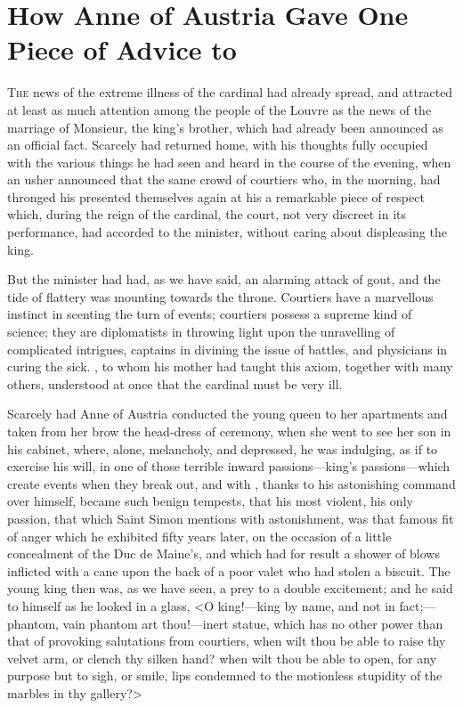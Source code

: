 \chapter{How Anne of Austria Gave One Piece of Advice to }

\lettrine{T}{he} news of the extreme illness of the cardinal had already spread, and attracted at least as much attention among the people of the Louvre as the news of the marriage of Monsieur, the king's brother, which had already been announced as an official fact. Scarcely had  returned home, with his thoughts fully occupied with the various things he had seen and heard in the course of the evening, when an usher announced that the same crowd of courtiers who, in the morning, had thronged his  presented themselves again at his  a remarkable piece of respect which, during the reign of the cardinal, the court, not very discreet in its performance, had accorded to the minister, without caring about displeasing the king.

But the minister had had, as we have said, an alarming attack of gout, and the tide of flattery was mounting towards the throne. Courtiers have a marvellous instinct in scenting the turn of events; courtiers possess a supreme kind of science; they are diplomatists in throwing light upon the unravelling of complicated intrigues, captains in divining the issue of battles, and physicians in curing the sick. , to whom his mother had taught this axiom, together with many others, understood at once that the cardinal must be very ill.

Scarcely had Anne of Austria conducted the young queen to her apartments and taken from her brow the head-dress of ceremony, when she went to see her son in his cabinet, where, alone, melancholy, and depressed, he was indulging, as if to exercise his will, in one of those terrible inward passions—king's passions—which create events when they break out, and with , thanks to his astonishing command over himself, became such benign tempests, that his most violent, his only passion, that which Saint Simon mentions with astonishment, was that famous fit of anger which he exhibited fifty years later, on the occasion of a little concealment of the Duc de Maine's, and which had for result a shower of blows inflicted with a cane upon the back of a poor valet who had stolen a biscuit. The young king then was, as we have seen, a prey to a double excitement; and he said to himself as he looked in a glass, <O king!—king by name, and not in fact;—phantom, vain phantom art thou!—inert statue, which has no other power than that of provoking salutations from courtiers, when wilt thou be able to raise thy velvet arm, or clench thy silken hand? when wilt thou be able to open, for any purpose but to sigh, or smile, lips condemned to the motionless stupidity of the marbles in thy gallery?>

